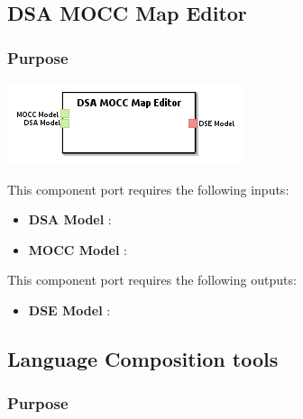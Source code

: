 \documentclass{gemoc} %
\begin{document}
\subsection{DSA MOCC Map Editor}


\subsubsection{Purpose}

\begin{center}
\includegraphics*[trim=0.0cm 0.0cm 0cm 0.0cm, clip=true]{../images/generated/Generated_DSA_MOCC_Map_Editor.png}
\end{center}

This component port requires the following inputs:
\begin{itemize}
  \item \textbf{DSA Model} :
  \item \textbf{MOCC Model} :
\end{itemize}

This component port requires the following outputs:
\begin{itemize}
  \item \textbf{DSE Model} :
\end{itemize}

\subsection{Language Composition tools}


\subsubsection{Purpose}
\end{document}
